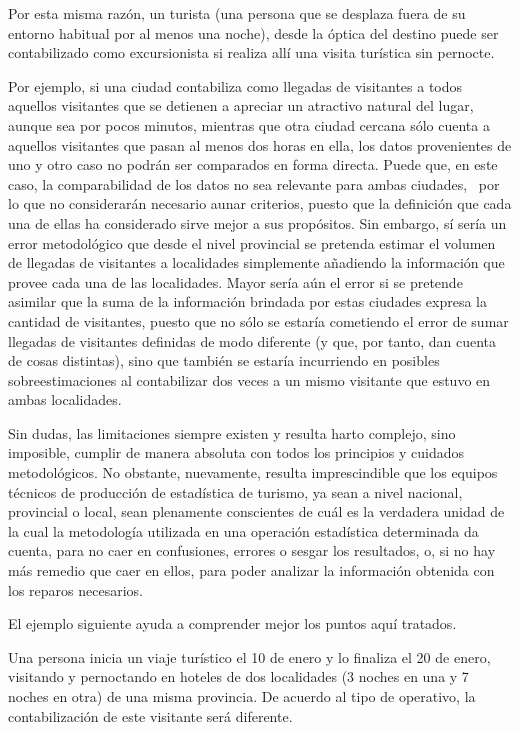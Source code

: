 \documentclass[
  openany]{book}
\begin{document}
Por esta misma razón, un turista (una persona que se desplaza fuera de su entorno habitual por al menos una noche), desde la óptica del destino puede ser contabilizado como excursionista si realiza allí una visita turística sin pernocte.

Por ejemplo, si una ciudad contabiliza como llegadas de visitantes a todos aquellos visitantes que se detienen a apreciar un atractivo natural del lugar, aunque sea por pocos minutos, mientras que otra ciudad cercana sólo cuenta a aquellos visitantes que pasan al menos dos horas en ella, los datos provenientes de uno y otro caso no podrán ser comparados en forma directa. Puede que, en este caso, la comparabilidad de los datos no sea relevante para ambas ciudades,~ por lo que no considerarán necesario aunar criterios, puesto que la definición que cada una de ellas ha considerado sirve mejor a sus propósitos. Sin embargo, sí sería un error metodológico que desde el nivel provincial se pretenda estimar el volumen de llegadas de visitantes a localidades simplemente añadiendo la información que provee cada una de las localidades. Mayor sería aún el error si se pretende asimilar que la suma de la información brindada por estas ciudades expresa la cantidad de visitantes, puesto que no sólo se estaría cometiendo el error de sumar llegadas de visitantes definidas de modo diferente (y que, por tanto, dan cuenta de cosas distintas), sino que también se estaría incurriendo en posibles sobreestimaciones al contabilizar dos veces a un mismo visitante que estuvo en ambas localidades.

Sin dudas, las limitaciones siempre existen y resulta harto complejo, sino imposible, cumplir de manera absoluta con todos los principios y cuidados metodológicos. No obstante, nuevamente, resulta imprescindible que los equipos técnicos de producción de estadística de turismo, ya sean a nivel nacional, provincial o local, sean plenamente conscientes de cuál es la verdadera unidad de la cual la metodología utilizada en una operación estadística determinada da cuenta, para no caer en confusiones, errores o sesgar los resultados, o, si no hay más remedio que caer en ellos, para poder analizar la información obtenida con los reparos necesarios.

El ejemplo siguiente ayuda a comprender mejor los puntos aquí tratados.

Una persona inicia un viaje turístico el 10 de enero y lo finaliza el 20 de enero, visitando y pernoctando en hoteles de dos localidades (3 noches en una y 7 noches en otra) de una misma provincia. De acuerdo al tipo de operativo, la contabilización de este visitante será diferente.
\end{document}

